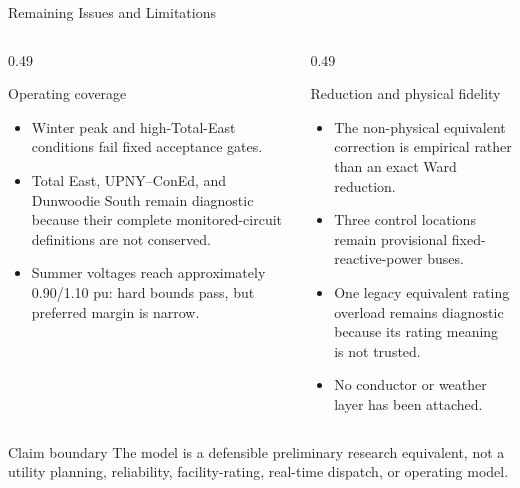 \documentclass[aspectratio=169,10pt]{beamer}
\begin{document}
\begin{frame}{Remaining Issues and Limitations}
\small
\begin{columns}[T,onlytextwidth]
\begin{column}{0.49\linewidth}
\begin{alertblock}{Operating coverage}
\begin{itemize}
  \item Winter peak and high-Total-East conditions fail fixed acceptance gates.
  \item Total East, UPNY--ConEd, and Dunwoodie South remain diagnostic because their complete monitored-circuit definitions are not conserved.
  \item Summer voltages reach approximately 0.90/1.10 pu: hard bounds pass, but preferred margin is narrow.
\end{itemize}
\end{alertblock}
\end{column}
\begin{column}{0.49\linewidth}
\begin{alertblock}{Reduction and physical fidelity}
\begin{itemize}
  \item The non-physical equivalent correction is empirical rather than an exact Ward reduction.
  \item Three control locations remain provisional fixed-reactive-power buses.
  \item One legacy equivalent rating overload remains diagnostic because its rating meaning is not trusted.
  \item No conductor or weather layer has been attached.
\end{itemize}
\end{alertblock}
\end{column}
\end{columns}

\begin{block}{Claim boundary}
The model is a defensible preliminary research equivalent, not a utility planning, reliability, facility-rating, real-time dispatch, or operating model.
\end{block}
\end{frame}
\end{document}
